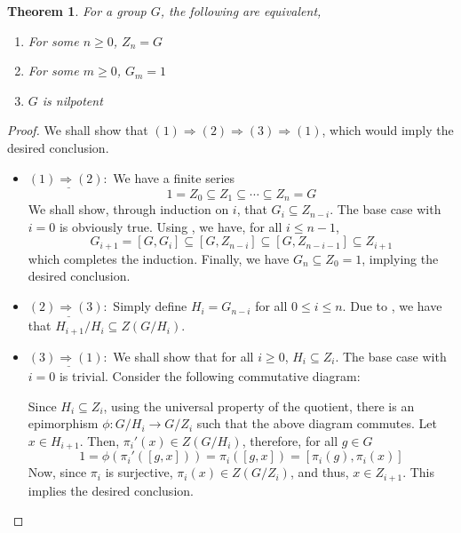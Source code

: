 \documentclass[12pt]{article}
\theoremstyle{thmstyle}
\newtheorem{theorem}{Theorem}[section]
\theoremstyle{defstyle}
\renewcommand{\le}{\leqslant}
\renewcommand{\ge}{\geqslant}
\begin{document}
\begin{theorem}
    For a group $G$, the following are equivalent,
    \begin{enumerate}
        \item For some $n\ge 0$, $Z_n = G$
        \item For some $m\ge 0$, $G_m = 1$
        \item $G$ is nilpotent
    \end{enumerate}
\end{theorem}
\begin{proof}
We shall show that $(1)\Longrightarrow (2)\Longrightarrow (3)\Longrightarrow (1)$, which would imply the desired conclusion.
\begin{itemize}
    \item $\underline{(1)\Longrightarrow(2):}$ We have a finite series
    \begin{equation*}
        1 = Z_0\subseteq Z_1\subseteq\cdots\subseteq Z_n = G
    \end{equation*}
    We shall show, through induction on $i$, that $G_i\subseteq Z_{n - i}$. The base case with $i = 0$ is obviously true. Using , we have, for all $i\le n - 1$,
    \begin{equation*}
        G_{i + 1} = [G, G_i]\subseteq [G, Z_{n - i}]\subseteq [G, Z_{n - i - 1}]\subseteq Z_{i + 1}
    \end{equation*}
    which completes the induction. Finally, we have $G_n\subseteq Z_0 = 1$, implying the desired conclusion.

    \item $\underline{(2)\Longrightarrow(3):}$ Simply define $H_i = G_{n - i}$ for all $0\le i\le n$. Due to , we have that $H_{i + 1}/H_i\subseteq Z(G/H_i)$.

    \item $\underline{(3)\Longrightarrow(1):}$ We shall show that for all $i\ge 0$, $H_i\subseteq Z_i$. The base case with $i = 0$ is trivial. Consider the following commutative diagram:
    \begin{center}
    \end{center}
    Since $H_i\subseteq Z_i$, using the universal property of the quotient, there is an epimorphism $\phi: G/H_i\to G/Z_i$ such that the above diagram commutes. Let $x\in H_{i + 1}$. Then, $\pi_i'(x)\in Z(G/H_i)$, therefore, for all $g\in G$
    \begin{equation*}
        1 = \phi\left(\pi_i'([g, x])\right) = \pi_i([g,x]) = [\pi_i(g), \pi_i(x)]
    \end{equation*}
    Now, since $\pi_i$ is surjective, $\pi_i(x)\in Z(G/Z_i)$, and thus, $x\in Z_{i + 1}$. This implies the desired conclusion.
\end{itemize}
\end{proof}
\end{document}
